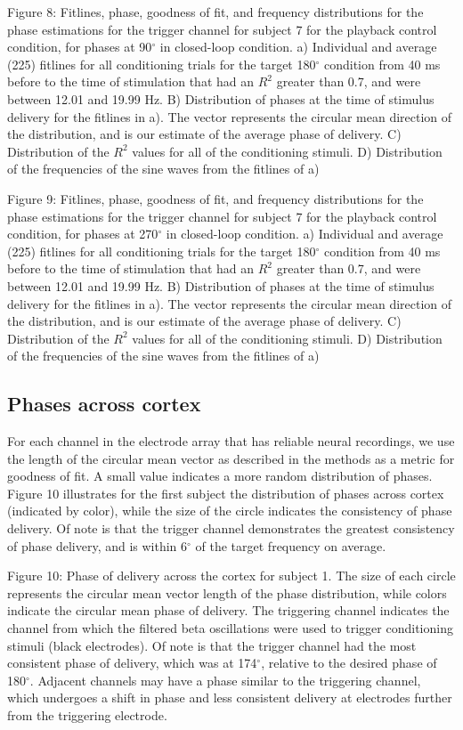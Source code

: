 Figure 8: Fitlines, phase, goodness of fit, and frequency distributions for the phase estimations for the trigger channel for subject 7 for the playback control condition, for phases at 90$^\circ$ in closed-loop condition. 
a) Individual and average (225) fitlines for all conditioning trials for the target 180$^\circ$ condition from 40 ms before to the time of stimulation that had an $R^2$ greater than 0.7, and were between 12.01 and 19.99 Hz. B) Distribution of phases at the time of stimulus delivery for the fitlines in a). The vector represents the circular mean direction of the distribution, and is our estimate of the average phase of delivery. C) Distribution of the $R^2$ values for all of the conditioning stimuli. D) Distribution of the frequencies of the sine waves from the fitlines of a)



Figure 9: Fitlines, phase, goodness of fit, and frequency distributions for the phase estimations for the trigger channel for subject 7 for the playback control condition, for phases at 270$^\circ$ in closed-loop condition. 
a) Individual and average (225) fitlines for all conditioning trials for the target 180$^\circ$ condition from 40 ms before to the time of stimulation that had an $R^2$ greater than 0.7, and were between 12.01 and 19.99 Hz. B) Distribution of phases at the time of stimulus delivery for the fitlines in a). The vector represents the circular mean direction of the distribution, and is our estimate of the average phase of delivery. C) Distribution of the $R^2$ values for all of the conditioning stimuli. D) Distribution of the frequencies of the sine waves from the fitlines of a)

\subsection{Phases across cortex}
For each channel in the electrode array that has reliable neural recordings, we use the length of the circular mean vector as described in the methods as a metric for goodness of fit. A small value indicates a more random distribution of phases. Figure 10 illustrates for the first subject the distribution of phases across cortex (indicated by color), while the size of the circle indicates the consistency of phase delivery. Of note is that the trigger channel demonstrates the greatest consistency of phase delivery, and is within 6$^\circ$ of the target frequency on average. 


Figure 10: Phase of delivery across the cortex for subject 1.
The size of each circle represents the circular mean vector length of the phase distribution, while colors indicate the circular mean phase of delivery. The triggering channel indicates the channel from which the filtered beta oscillations were used to trigger conditioning stimuli (black electrodes). Of note is that the trigger channel had the most consistent phase of delivery, which was at 174$^\circ$, relative to the desired phase of 180$^\circ$. Adjacent channels may have a phase similar to the triggering channel, which undergoes a shift in phase and less consistent delivery at electrodes further from the triggering electrode. 

